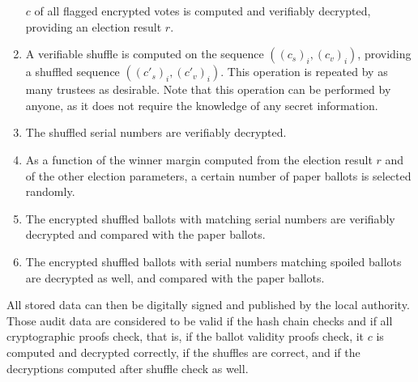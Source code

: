 \begin{enumerate}
  $c$ of all flagged encrypted votes is computed and verifiably
  decrypted, providing an election result $r$.
\item A verifiable shuffle is computed on the sequence $((c_s)_i,
  (c_v)_i)$, providing a shuffled sequence $((c'_s)_i,
  (c'_v)_i)$. This operation is repeated by as many trustees as
  desirable. Note that this operation can be performed by anyone, as
  it does not require the knowledge of any secret information.
\item The shuffled serial numbers are verifiably decrypted.
\item As a function of the winner margin computed from the election
  result $r$ and of the other election parameters, a certain number of
  paper ballots is selected randomly. 
\item The encrypted shuffled ballots with matching serial numbers are
  verifiably decrypted and compared with the paper ballots.
\item The encrypted shuffled ballots with serial numbers matching 
  spoiled ballots are decrypted as well, and compared with the paper ballots. 
\end{enumerate}

All stored data can then be digitally signed and published by the
local authority. Those audit data are considered to be valid if the
hash chain checks and if all cryptographic proofs check, that is, if
the ballot validity proofs check, it $c$ is computed and decrypted
correctly, if the shuffles are correct, and if the decryptions
computed after shuffle check as well.


